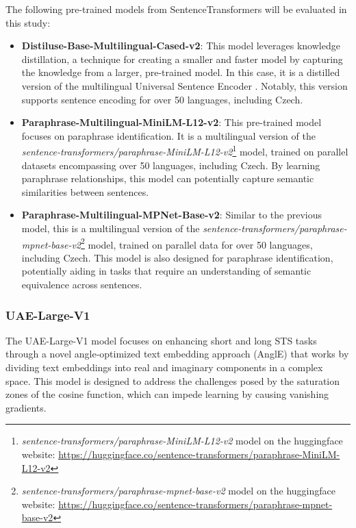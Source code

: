 The following pre-trained models from SentenceTransformers will be evaluated in this study:
\begin{itemize}
  \item \textbf{Distiluse-Base-Multilingual-Cased-v2}:
    This model leverages knowledge distillation, a technique for creating a smaller and faster model by capturing the knowledge from a larger, pre-trained model.
    In this case, it is a distilled version of the multilingual Universal Sentence Encoder \cite{yang2019multilingual}.
    Notably, this version supports sentence encoding for over 50 languages, including Czech.
  \item \textbf{Paraphrase-Multilingual-MiniLM-L12-v2}: This pre-trained model focuses on paraphrase identification.
    It is a multilingual version of the \textit{sentence-transformers/paraphrase-MiniLM-L12-v2}\footnote{\textit{sentence-transformers/paraphrase-MiniLM-L12-v2} model on the huggingface website: \url{https://huggingface.co/sentence-transformers/paraphrase-MiniLM-L12-v2}} model, trained on parallel datasets encompassing over 50 languages, including Czech.
    By learning paraphrase relationships, this model can potentially capture semantic similarities between sentences.
  \item \textbf{Paraphrase-Multilingual-MPNet-Base-v2}: Similar to the previous model, this is a multilingual version of the \textit{sentence-transformers/paraphrase-mpnet-base-v2}\footnote{\textit{sentence-transformers/paraphrase-mpnet-base-v2} model on the huggingface website: \url{https://huggingface.co/sentence-transformers/paraphrase-mpnet-base-v2}} model, trained on parallel data for over 50 languages, including Czech.
    This model is also designed for paraphrase identification, potentially aiding in tasks that require an understanding of semantic equivalence across sentences.
\end{itemize}



\subsubsection{UAE-Large-V1} \label{model-uae-large-v1}
The UAE-Large-V1 model \cite{li2024angleoptimized} focuses on enhancing short and long \ac{STS} tasks through a novel angle-optimized text embedding approach (AnglE) that works by dividing text embeddings into real and imaginary components in a complex space.
This model is designed to address the challenges posed by the saturation zones of the cosine function, which can impede learning by causing vanishing gradients.

